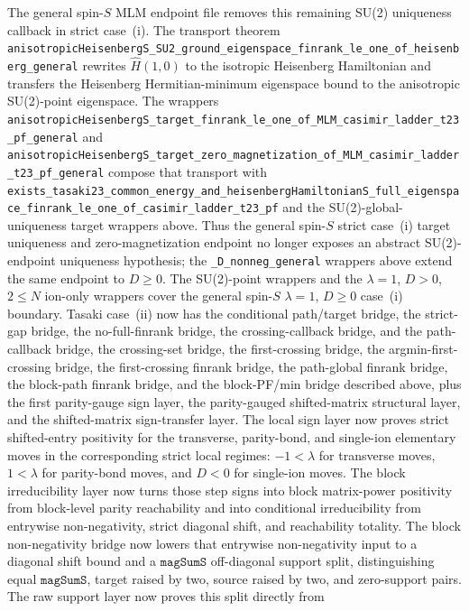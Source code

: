 \documentclass[a4paper,11pt]{article}
\begin{document}
The general spin-\(S\) MLM endpoint file removes this remaining SU(2)
uniqueness callback in strict case~(i).  The transport theorem
\texttt{anisotropicHeisenbergS\_SU2\_ground\_eigenspace\_finrank\_le\_one\_of\_heisenberg\_general}
rewrites \(\hat H(1,0)\) to the isotropic Heisenberg Hamiltonian and transfers
the Heisenberg Hermitian-minimum eigenspace bound to the anisotropic
SU(2)-point eigenspace.  The wrappers
\texttt{anisotropicHeisenbergS\_target\_finrank\_le\_one\_of\_MLM\_casimir\_ladder\_t23\_pf\_general}
and
\texttt{anisotropicHeisenbergS\_target\_zero\_magnetization\_of\_MLM\_casimir\_ladder\_t23\_pf\_general}
compose that transport with
\texttt{exists\_tasaki23\_common\_energy\_and\_heisenbergHamiltonianS\_full\_eigenspace\_finrank\_le\_one\_of\_casimir\_ladder\_t23\_pf}
and the SU(2)-global-uniqueness target wrappers above.  Thus the general
spin-\(S\) strict case~(i) target uniqueness and zero-magnetization endpoint no
longer exposes an abstract SU(2)-endpoint uniqueness hypothesis; the
\texttt{\_D\_nonneg\_general} wrappers above extend the same endpoint to
\(D\ge0\).  The SU(2)-point wrappers and the
\(\lambda=1\), \(D>0\), \(2\le N\) ion-only wrappers cover the general
spin-\(S\) \(\lambda=1\), \(D\ge0\) case~(i) boundary.  Tasaki case~(ii) now
has the conditional path/target bridge, the strict-gap bridge, the
no-full-finrank bridge, the crossing-callback bridge, and the path-callback
bridge, the crossing-set bridge, the first-crossing bridge, the
argmin-first-crossing bridge, the first-crossing finrank bridge, the
path-global finrank bridge, the block-path finrank bridge, and the
block-PF/min bridge described above, plus the first parity-gauge sign layer,
the parity-gauged shifted-matrix structural layer, and the shifted-matrix
sign-transfer layer.  The local sign layer now proves strict shifted-entry
positivity for the transverse, parity-bond, and single-ion elementary moves in
the corresponding strict local regimes: \(-1<\lambda\) for transverse moves,
\(1<\lambda\) for parity-bond moves, and \(D<0\) for single-ion moves.  The
block irreducibility layer now turns those step signs into block matrix-power
positivity from block-level parity reachability and into conditional
irreducibility from entrywise non-negativity, strict diagonal shift, and
reachability totality.  The block non-negativity bridge now lowers that
entrywise non-negativity input to a diagonal shift bound and a
\(\texttt{magSumS}\) off-diagonal support split, distinguishing equal
\(\texttt{magSumS}\), target raised by two, source raised by two, and
zero-support pairs.  The raw support layer now proves this split directly from
\end{document}
